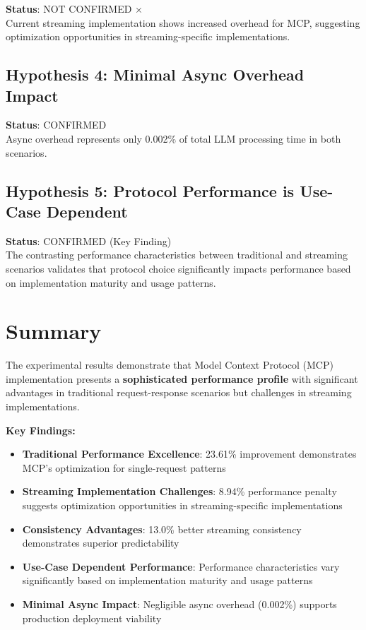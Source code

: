 \textbf{Status}: NOT CONFIRMED $\times$ \\
Current streaming implementation shows increased overhead for MCP, suggesting optimization opportunities in streaming-specific implementations.

\subsection{Hypothesis 4: Minimal Async Overhead Impact}

\textbf{Status}: CONFIRMED \checkmark \\
Async overhead represents only 0.002\% of total LLM processing time in both scenarios.

\subsection{Hypothesis 5: Protocol Performance is Use-Case Dependent}

\textbf{Status}: CONFIRMED \checkmark (Key Finding) \\
The contrasting performance characteristics between traditional and streaming scenarios validates that protocol choice significantly impacts performance based on implementation maturity and usage patterns.

\section{Summary}

The experimental results demonstrate that Model Context Protocol (MCP) implementation presents a \textbf{sophisticated performance profile} with significant advantages in traditional request-response scenarios but challenges in streaming implementations.

\textbf{Key Findings:}

\begin{itemize}
    \item \textbf{Traditional Performance Excellence}: 23.61\% improvement demonstrates MCP's optimization for single-request patterns
    \item \textbf{Streaming Implementation Challenges}: 8.94\% performance penalty suggests optimization opportunities in streaming-specific implementations
    \item \textbf{Consistency Advantages}: 13.0\% better streaming consistency demonstrates superior predictability
    \item \textbf{Use-Case Dependent Performance}: Performance characteristics vary significantly based on implementation maturity and usage patterns
    \item \textbf{Minimal Async Impact}: Negligible async overhead (0.002\%) supports production deployment viability
\end{itemize}

